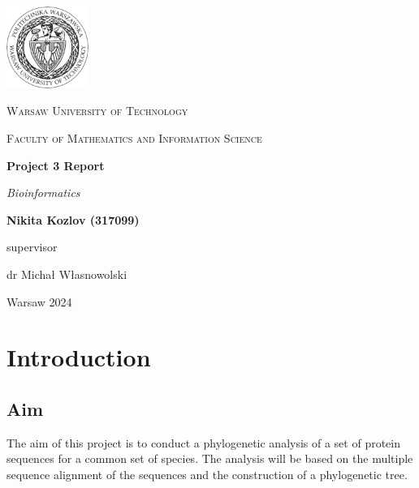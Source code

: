 \documentclass[11pt, a4paper, hidelinks]{article}
\begin{document}
\begin{titlepage}
    \centering
    \vspace*{0.5 cm}
    \includegraphics[width=0.20\textwidth]{logo.png}\par\vspace{1cm}
    {\scshape\LARGE Warsaw University of Technology \par}
    \vspace{1cm}
    {\scshape\Large Faculty of Mathematics and Information Science\par}
    \vspace{1.5cm}
    {\huge\bfseries Project 3 Report\par}
    \vspace{1cm}
    {\Large\itshape Bioinformatics\par}
    \vfill
    \begin{flushright}

    {\Large\bfseries Nikita Kozlov (317099)\par}
    \vfill
    {supervisor\par}
    {\Large dr Michał Własnowolski \par}

    \end{flushright}
    \vfill
    {\large Warsaw 2024\par}
    \vspace{1cm}
\end{titlepage}

\tableofcontents

\newpage

\section{Introduction}\label{sec:introduction}

\subsection{Aim}\label{subsec:aim}

The aim of this project is to conduct a phylogenetic analysis of a set of protein sequences for a common set of species. The analysis will be based on the multiple sequence alignment of the sequences and the construction of a phylogenetic tree.
\end{document}
